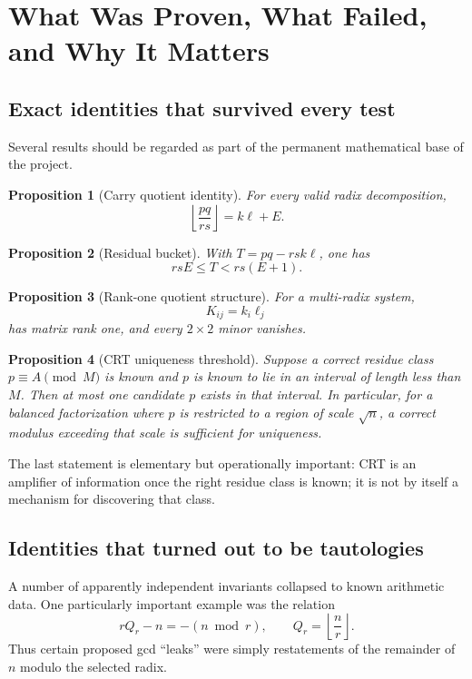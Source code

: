 \documentclass[11pt,a4paper]{article}
\newtheorem{proposition}{Proposition}
\begin{document}
\section{What Was Proven, What Failed, and Why It Matters}
\subsection{Exact identities that survived every test}
Several results should be regarded as part of the permanent mathematical base of the project.

\begin{proposition}[Carry quotient identity]
For every valid radix decomposition,
\[
\left\lfloor\frac{pq}{rs}\right\rfloor=k\ell+E.
\]
\end{proposition}

\begin{proposition}[Residual bucket]
With \(T=pq-rsk\ell\), one has
\[
rsE\le T<rs(E+1).
\]
\end{proposition}

\begin{proposition}[Rank-one quotient structure]
For a multi-radix system,
\[
K_{ij}=k_i\ell_j
\]
has matrix rank one, and every \(2\times2\) minor vanishes.
\end{proposition}

\begin{proposition}[CRT uniqueness threshold]
Suppose a correct residue class \(p\equiv A\pmod M\) is known and \(p\) is known to lie in an interval of length less than \(M\). Then at most one candidate \(p\) exists in that interval. In particular, for a balanced factorization where \(p\) is restricted to a region of scale \(\sqrt n\), a correct modulus exceeding that scale is sufficient for uniqueness.
\end{proposition}

The last statement is elementary but operationally important: CRT is an amplifier of information once the right residue class is known; it is not by itself a mechanism for discovering that class.

\subsection{Identities that turned out to be tautologies}
A number of apparently independent invariants collapsed to known arithmetic data. One particularly important example was the relation
\begin{equation}
    rQ_r-n=-(n\bmod r),
    \qquad
    Q_r=\left\lfloor\frac nr\right\rfloor.
\end{equation}
Thus certain proposed gcd ``leaks'' were simply restatements of the remainder of \(n\) modulo the selected radix.
\end{document}
